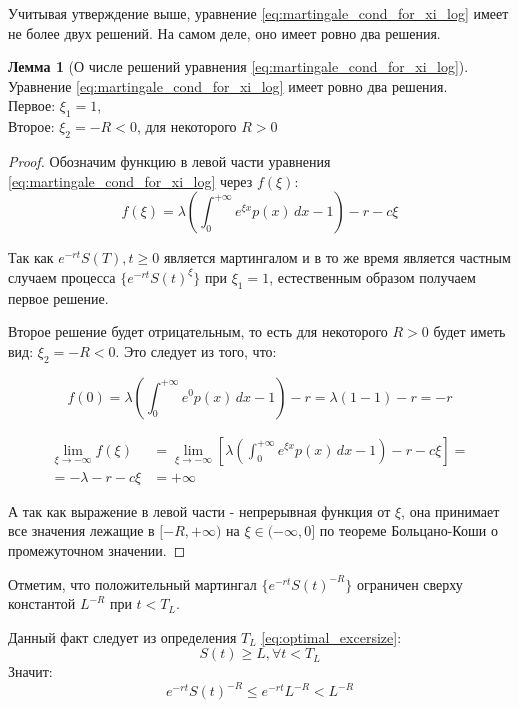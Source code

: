 \documentclass[a4paper,12pt]{article}
\theoremstyle{definition}
\newtheorem{lemma}{Лемма}
\begin{document}
Учитывая утверждение выше, уравнение \eqref{eq:martingale_cond_for_xi_log} имеет не более двух решений. На самом деле, оно имеет ровно два решения.
\begin{lemma}[О числе решений уравнения \eqref{eq:martingale_cond_for_xi_log}]\label{thm:solution_for_mart_cond_m1}
Уравнение \eqref{eq:martingale_cond_for_xi_log} имеет ровно два решения. \\
Первое: $\xi_1 = 1$, \\
Второе: $\xi_2 = -R < 0$, для некоторого $R > 0$
\end{lemma}
\begin{proof}
Обозначим функцию в левой части уравнения \eqref{eq:martingale_cond_for_xi_log} через $f(\xi)$:
\begin{equation*}
f(\xi) = \lambda \left(\int_{0}^{+\infty} e^{\xi x} p(x) \,dx - 1\right) - r - c\xi
\end{equation*}

Так как ${e^{-rt} S(T), t \ge 0}$ является мартингалом и в то же время является частным случаем процесса  $\{e^{-rt}S(t)^{\xi}\}$ при $\xi_1 = 1$, естественным образом получаем первое решение.

Второе решение будет отрицательным, то есть для некоторого $R > 0$ будет иметь вид: $\xi_2 = -R < 0$.
Это следует из того, что:

\begin{equation*}
f(0) = \lambda \left(\int_{0}^{+\infty} e^{0} p(x) \,dx - 1\right) - r = \lambda (1 - 1) - r = -r
\end{equation*}

\begin{equation*}
\begin{split}
\lim_{\xi\to-\infty} f(\xi) &= \lim_{\xi\to-\infty} \left[ \lambda \left(\int_{0}^{+\infty} e^{\xi x} p(x) \,dx - 1\right) - r - c\xi \right] =\\
= - \lambda - r - c \xi &= +\infty
\end{split}
\end{equation*}

А так как выражение в левой части - непрерывная функция от $\xi$, она принимает все значения лежащие в $[-R, +\infty)$ на $\xi \in (-\infty, 0]$ по теореме Больцано-Коши о промежуточном значении.
\end{proof}

Отметим, что положительный мартингал $\{e^{-rt} S(t)^{-R}\}$ ограничен сверху константой $L^{-R}$ при $t < T_L$. 

Данный факт следует из определения $T_L$ \eqref{eq:optimal_excersize}:
\begin{equation*}
S(t) \ge L, \forall t < T_L
\end{equation*}
Значит:
\begin{equation*}
e^{-rt}S(t)^{-R} \le e^{-rt}L^{-R} < L^{-R}
\end{equation*}
\end{document}

